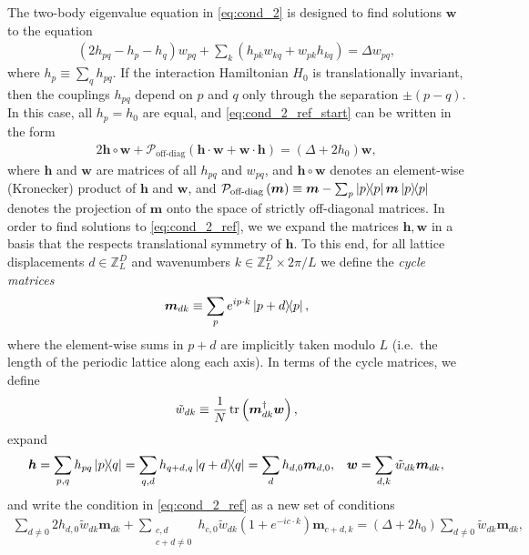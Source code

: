\documentclass[nofootinbib,notitlepage,11pt]{revtex4-2}
\renewcommand{\t}{\text} %
\newcommand{\f}[2]{\dfrac{#1}{#2}} %
\newcommand{\p}[1]{\left(#1\right)} %
\renewcommand{\c}{\cdot} %
\newcommand{\m}{\bm} %
\newcommand{\1}{\mathds{1}}
\renewcommand{\P}{\mathcal{P}}
\newcommand{\ZZ}{\mathbb{Z}}
\begin{document}
The two-body eigenvalue equation in \eqref{eq:cond_2} is designed to
find solutions $\m w$ to the equation
\begin{align}
  \p{2h_{pq}-h_p-h_q} w_{pq}
  + \sum_k \p{h_{pk} w_{kq} + w_{pk} h_{kq}}
  = \Delta w_{pq},
  \label{eq:cond_2_ref_start}
\end{align}
where $h_p\equiv\sum_q h_{pq}$.  If the interaction Hamiltonian $H_0$
is translationally invariant, then the couplings $h_{pq}$ depend on
$p$ and $q$ only through the separation $\pm\p{p-q}$.  In this case,
all $h_p=h_0$ are equal, and \eqref{eq:cond_2_ref_start} can be
written in the form
\begin{align}
  2 \m h\circ \m w + \P_{\t{off-diag}}\p{\m h\c\m w + \m w\c\m h}
  = \p{\Delta + 2h_0} \m w,
  \label{eq:cond_2_ref}
\end{align}
where $\m h$ and $\m w$ are matrices of all $h_{pq}$ and $w_{pq}$, and
$\m h\circ\m w$ denotes an element-wise (Kronecker) product of $\m h$
and $\m w$, and
$\P_{\t{off-diag}}\p{\m m}\equiv \m m-\sum_p\op{p}\m m\op{p}$ denotes
the projection of $\m m$ onto the space of strictly off-diagonal
matrices.  In order to find solutions to \eqref{eq:cond_2_ref}, we we
expand the matrices $\m h,\m w$ in a basis that the respects
translational symmetry of $\m h$.  To this end, for all lattice
displacements $d\in\ZZ_L^D$ and wavenumbers $k\in\ZZ_L^D\times2\pi/L$
we define the {\it cycle matrices}
\begin{align}
  \m m_{dk} \equiv \sum_p e^{ip\c k} \op{p+d}{p},
  \label{eq:cycle}
\end{align}
where the element-wise sums in $p+d$ are implicitly taken modulo $L$
(i.e.~the length of the periodic lattice along each axis).  In terms of the cycle matrices, we define
\begin{align}
  \tilde w_{dk} \equiv \f1N \tr\p{\m m_{dk}^\dag \m w},
\end{align}
expand
\begin{align}
  \m h = \sum_{p,q} h_{pq} \op{p}{q}
  = \sum_{q,d} h_{q+d,q} \op{q+d}{q}
  = \sum_d h_{d,0} \m m_{d,0},
  &&
  \m w = \sum_{d,k} \tilde w_{dk} \m m_{dk},
\end{align}
and write the condition in \eqref{eq:cond_2_ref} as a new set of
conditions
\begin{align}
  \sum_{d\ne0} 2 h_{d,0} \tilde w_{dk} \m m_{dk}
  + \sum_{\substack{c,d\\c+d\ne0}}
  h_{c,0} \tilde w_{dk} \p{1 + e^{-ic\c k}} \m m_{c+d,k}
  = \p{\Delta + 2 h_0} \sum_{d\ne0} \tilde w_{dk} \m m_{dk},
\end{align}
\end{document}
